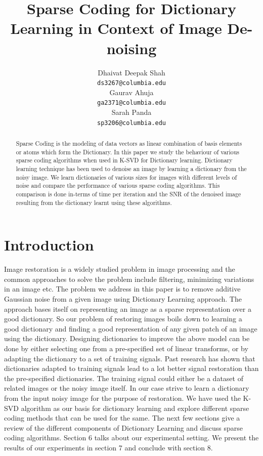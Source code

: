 \documentclass{article} %
\title{Sparse Coding for Dictionary Learning in Context of Image De-noising}
\author{
Dhaivat Deepak Shah\\
\texttt{ds3267@columbia.edu} \\
\And
Gaurav Ahuja\\
\texttt{ga2371@columbia.edu} \\
\And
Sarah Panda\\
\texttt{sp3206@columbia.edu} \\
}
\begin{document}
\maketitle


\begin{abstract}
Sparse Coding is the modeling of data vectors as linear combination of basis elements or atoms which form the Dictionary. In this paper we study the behaviour of various sparse coding algorithms when used in K-SVD \cite{aharon2006svd} for Dictionary learning. Dictionary learning technique has been used to denoise an image by learning a dictionary from the noisy image. We learn dictionaries of various sizes for images with different levels of noise and compare the performance of various sparse coding algorithms. This comparison is done in-terms of time per iteration and the SNR of the denoised image resulting from the dictionary learnt using these algorithms.
\end{abstract}


\section{Introduction}

Image restoration is a widely studied problem in image processing and the common approaches to solve the problem include filtering, minimizing variations in an image etc. The problem we address in this paper is to remove additive Gaussian noise from a given image using Dictionary Learning approach. The approach bases itself on representing an image as a sparse representation over a good dictionary. So our problem of restoring images boils down to learning a good dictionary and finding a good representation of any given patch of an image using the dictionary. Designing dictionaries to improve the above model can be done by either selecting one from a pre-specified set of linear transforms, or by adapting the dictionary to a set of training signals. Past research \cite{aharon2006svd} has shown that dictionaries adapted to training signals lead to a lot better signal restoration than the pre-specified dictionaries. The training signal could either be a dataset of related images or the noisy image itself. In our case strive to learn a dictionary from the input noisy image for the purpose of restoration. We have used the K-SVD algorithm as our basis for dictionary learning and explore different sparse coding methods that can be used for the same. 
The next few sections give a review of the different components of Dictionary Learning and discuss sparse coding algorithms. Section 6 talks about our experimental setting. We present the results of our experiments in section 7 and conclude with section 8. 
\end{document}
